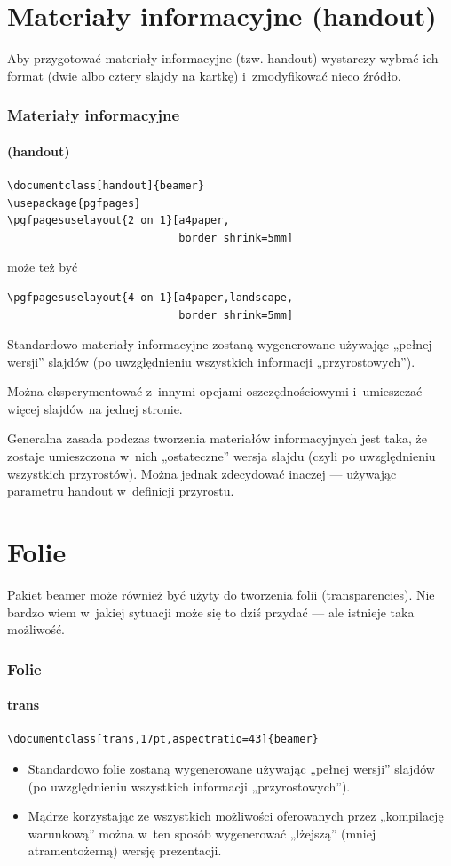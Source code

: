 \section{Materiały informacyjne (handout)}

Aby przygotować materiały informacyjne (tzw. handout) wystarczy wybrać ich format (dwie albo cztery slajdy na kartkę) i~zmodyfikować nieco źródło.
\begin{frame}[fragile]
 \frametitle<presentation>{Materiały informacyjne}
 \framesubtitle<presentation>{(handout)}
 \hypertarget{sec:handout}{}
 \begin{lstlisting}
\documentclass[handout]{beamer}
\usepackage{pgfpages}
\pgfpagesuselayout{2 on 1}[a4paper,
                           border shrink=5mm]
\end{lstlisting}
 może też być
 \begin{lstlisting}
\pgfpagesuselayout{4 on 1}[a4paper,landscape,
                           border shrink=5mm]
\end{lstlisting}
 Standardowo materiały informacyjne zostaną wygenerowane używając „pełnej wersji” slajdów (po uwzględnieniu wszystkich informacji „przyrostowych”).
\end{frame}
Można eksperymentować z~innymi opcjami oszczędnościowymi i~umieszczać więcej slajdów na jednej stronie.

Generalna zasada podczas tworzenia materiałów informacyjnych jest taka, że zostaje umieszczona w~nich „ostateczne” wersja slajdu (czyli po uwzględnieniu wszystkich przyrostów). Można jednak zdecydować inaczej — używając parametru handout w~definicji przyrostu.

\section{Folie}

Pakiet beamer może również być użyty do tworzenia folii (transparencies). Nie bardzo wiem w~jakiej sytuacji może się to dziś przydać — ale istnieje taka możliwość.

\begin{frame}[fragile]
 \frametitle<presentation>{Folie}
 \framesubtitle{trans}
 \hypertarget{sec:trans}{}
 \begin{lstlisting}
\documentclass[trans,17pt,aspectratio=43]{beamer}
\end{lstlisting}
 \begin{itemize}
  \item
        Standardowo folie zostaną wygenerowane używając „pełnej wersji” slajdów (po uwzględnieniu wszystkich informacji „przyrostowych”).
  \item
        Mądrze korzystając ze wszystkich możliwości oferowanych przez „kompilację warunkową”  można w~ten sposób wygenerować „lżejszą” (mniej atramentożerną) wersję prezentacji.
 \end{itemize}

\end{frame}

